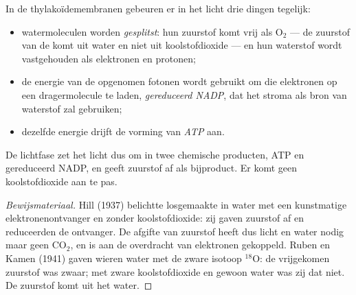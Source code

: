 \begin{proposition}\label{prop:g12:photosynthesis:lightphase}
In de thylakoïdemembranen gebeuren er in het licht drie dingen tegelijk:
\begin{itemize}
  \item watermoleculen worden \emph{gesplitst}: hun zuurstof komt vrij als
        $\mathrm{O_2}$ --- de zuurstof van de  komt uit water
        en niet uit koolstofdioxide --- en hun waterstof wordt vastgehouden
        als elektronen en protonen;
  \item de energie van de opgenomen fotonen wordt gebruikt om die
        elektronen op een dragermolecule te laden, \emph{gereduceerd
        NADP}, dat het stroma als bron van waterstof zal gebruiken;
  \item dezelfde energie drijft de vorming van \emph{ATP} aan.
\end{itemize}
De lichtfase zet het licht dus om in twee chemische producten, ATP en
gereduceerd NADP, en geeft zuurstof af als bijproduct. Er komt geen
koolstofdioxide aan te pas.
\end{proposition}
\begin{proof}[Bewijsmateriaal]
Hill (1937) belichtte losgemaakte  in water met een
kunstmatige elektronenontvanger en zonder koolstofdioxide: zij gaven
zuurstof af en reduceerden de ontvanger. De afgifte van zuurstof heeft dus
licht en water nodig maar geen $\mathrm{CO_2}$, en is aan de overdracht
van elektronen gekoppeld. Ruben en Kamen (1941) gaven wieren water met de
zware isotoop $^{18}$O: de vrijgekomen zuurstof was zwaar; met zware
koolstofdioxide en gewoon water was zij dat niet. De zuurstof komt uit het
water.
\end{proof}

